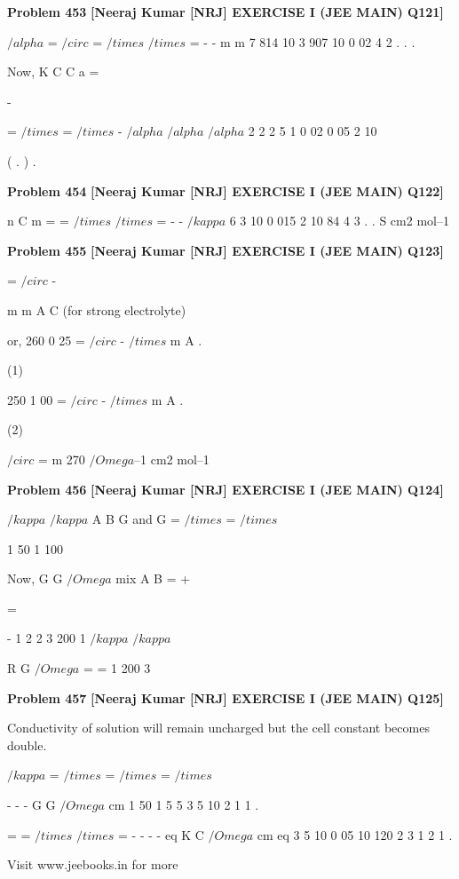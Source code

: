 \begin{problembox}
\textbf{Problem 453} \hfill \textbf{[Neeraj Kumar [NRJ] EXERCISE I (JEE MAIN) Q121]}
\label{q:ext-nrj_all_questions-453}

$/alpha$ =  
 $/circ$
=
$/times$
$/times$
=
-
-
m
m
7 814
10
3 907
10
0 02
4
2
.
.
.
 
 Now, K
C
C
a =
 
-
 
=
$/times$
=
$/times$
-
$/alpha$
$/alpha$
$/alpha$
2
2
2
5
1
0 02
0 05
2
10

( .
)
.
\end{problembox}

\begin{problembox}
\textbf{Problem 454} \hfill \textbf{[Neeraj Kumar [NRJ] EXERCISE I (JEE MAIN) Q122]}
\label{q:ext-nrj_all_questions-454}

n
C
m =
=
$/times$
$/times$
=
-
-
$/kappa$
6 3 10
0 015
2
10
84
4
3
.
.
 S cm2 mol--1
\end{problembox}

\begin{problembox}
\textbf{Problem 455} \hfill \textbf{[Neeraj Kumar [NRJ] EXERCISE I (JEE MAIN) Q123]}
\label{q:ext-nrj_all_questions-455}

 
=  $/circ$
-
 
m
m
A
C 
(for strong electrolyte)
 
 or, 260
0 25
=  $/circ$
-
$/times$
m
A
.
 
(1)
 
 
250
1 00
=  $/circ$
-
$/times$
m
A
.
 
(2)
 
    $/circ$
=
m
270 $/Omega$--1 cm2 mol--1
\end{problembox}

\begin{problembox}
\textbf{Problem 456} \hfill \textbf{[Neeraj Kumar [NRJ] EXERCISE I (JEE MAIN) Q124]}
\label{q:ext-nrj_all_questions-456}

$/kappa$
$/kappa$
A
B
G and 
G
=
$/times$
=
$/times$
 
 
1
50
1
100
 
 Now, G
G
$/Omega$
mix
A
B
=
+
 
  
 
  =
 
-
1
2
2
3
200
1
$/kappa$
$/kappa$
 
   R
G
$/Omega$
=
=
1
200
3
\end{problembox}

\begin{problembox}
\textbf{Problem 457} \hfill \textbf{[Neeraj Kumar [NRJ] EXERCISE I (JEE MAIN) Q125]}
\label{q:ext-nrj_all_questions-457}

Conductivity of solution will remain uncharged 
but the cell constant becomes double.
 
 
$/kappa$ =
$/times$
=
$/times$
=
$/times$
 
-
-
-
G G
$/Omega$ cm
1
50
1 5
5
3
5 10 2
1
1
.
 
    
=
=
$/times$
$/times$
=
-
-
-
-
eq
K
C
$/Omega$ cm eq
3
5
10
0 05 10
120
2
3
1
2
1
.
 
 
Visit www.jeebooks.in for more
\end{problembox}

